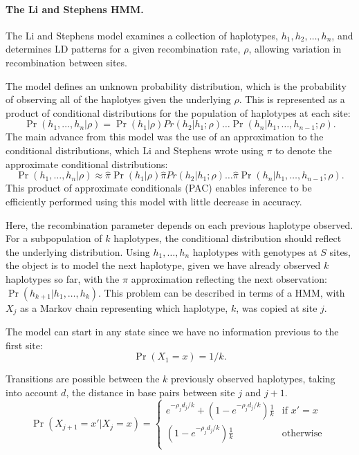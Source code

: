 \paragraph{The Li and Stephens HMM.}

The Li and Stephens model examines a collection of haplotypes, $h_1,h_2,\dots,h_n$, and determines LD patterns for a given recombination rate, $\rho$, allowing variation in recombination between sites.

The model defines an unknown probability distribution, which is the probability of observing all of the haplotyes given the underlying $\rho$.
This is represented as a product of conditional distributions for the population of haplotypes at each site:
\begin{equation}
    \Pr(h_1,\dots, h_n | \rho ) = \Pr(h_1 |\rho) Pr(h_2 |h_1; \rho) \dots \Pr(h_n |h_1,\dots, h_{n-1}; \rho) .
\end{equation}
The main advance from this model was the use of an approximation to the conditional distributions, which Li and Stephens wrote using $\pi$ to denote the approximate conditional distributions:
\begin{equation}
    \Pr(h_1,\dots, h_n | \rho ) \approx \hat{\pi} \Pr(h_1 |\rho) \hat{\pi} Pr(h_2 |h_1; \rho) \dots \hat{\pi} \Pr(h_n |h_1,\dots, h_{n-1}; \rho) .
\end{equation}
This product of approximate conditionals (PAC) enables inference to be efficiently performed using this model with little decrease in accuracy\cite{Li2003}.

Here, the recombination parameter depends on each previous haplotype observed.
For a subpopulation of $k$ haplotypes, the conditional distribution should reflect the underlying distribution.
Using $h_1,\dots,h_n$ haplotypes with genotypes at $S$ sites, the object is to model the next haplotype, given we have already observed $k$ haplotypes so far, with the $\pi$ approximation reflecting the next observation:
$ \Pr( h_{k+1} | h_1,\dots,h_k) $.
This problem can be described in terms of a HMM, with $X_j$ as a Markov chain representing which haplotype, $k$, was copied at site $j$.

The model can start in any state since we have no information previous to the first site:
\begin{equation}
    \Pr( X_1 = x ) = 1 / k .
\end{equation}

Transitions are possible between the $k$ previously observed haplotypes, taking into account $d$, the distance in base pairs between site $j$ and $j+1$.
\begin{equation}
    \Pr( X_{j+1} = x' | X_j = x ) = 
    \begin{cases}
        e^{-\rho_j d_j / k} + ( 1- e^{-\rho_j d_j / k} ) \frac{1}{k}
        &  \text{if $x' = x$ } \\
        ( 1- e^{-\rho_j d_j / k} ) \frac{1}{k}
        &  \text{otherwise } \\
    \end{cases}
\end{equation}

